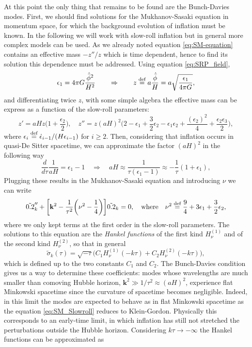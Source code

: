 At this point the only thing that remains to be found are the Bunch-Davies modes. First, we should find solutions for the Mukhanov-Sasaki equation in momentum space, for which the background evolution of inflation must be known. In the following we will work with slow-roll inflation but in general more complex models can be used. As we already noted equation \eqref{eq:SM-equation} contains an effective mass $-z''/z$ which is time dependent, hence to find its solution this dependence must be addressed. Using equation \eqref{eq:SRP_field},
$$\epsilon_1=4\pi G\frac{\dot{\bar\phi}^2}{H^2}\qquad \Rightarrow\qquad z\stackrel{\text{def}}{=} a\frac{\dot{\bar\phi}}{H}=a\sqrt{\frac{\epsilon_1}{4\pi G}},$$
 and differentiating twice $z$, with some simple algebra the effective mass can be express as a function of the slow-roll parameters: 
$$z'=aHz\Big(1+\frac{\epsilon_2}{2}\Big),\quad z''=z(aH)^2\bigg(2-\epsilon_1+\frac{3}{2}\epsilon_2- \epsilon_1\epsilon_2+\frac{(\epsilon_2)^2}{4}+\frac{\epsilon_2\epsilon_3}{2}\bigg),$$
where $\epsilon_i\stackrel{\text{def}}{=} \dot{\epsilon}_{i-1}/(H\epsilon_{i-1})$ for $i\geq 2$.
Then, considering that inflation occurs in quasi-De Sitter spacetime, we can approximate the factor $(aH)^2$ in the following way
$$\frac{d}{d\tau}\frac{1}{aH}=\epsilon_1-1\quad \Rightarrow\quad aH\approx\frac{1}{\tau(\epsilon_1-1)}\approx-\frac{1}{\tau}(1+\epsilon_1),$$
Plugging these results in the Mukhanov-Sasaki equation and introducing $\nu$ we can write
\begin{equation}
    \tilde{0.2}_k''+\bigg[\mathbf k^2-\frac{1}{\tau^2}\bigg(\nu^2-\frac{1}{4}\bigg)\bigg]\tilde{0.2}_k=0,\quad\text{where}\quad\nu^2\stackrel{\text{def}}{=} \frac{9}{4}+3\epsilon_1+\frac{3}{2}\epsilon_2,\label{eq:SM_Slowroll}
\end{equation}
where we only kept terms at the first order in the slow-roll parameters. The solutions to this equation are the \emph{Hankel functions} of the first kind $H_\nu^{(1)}$ and of the second kind $H_\nu^{(2)}$, so that in general
$$\tilde\sigma_k(\tau)=\sqrt{-\tau}\big(C_1H_\nu^{(1)}(-k\tau)+C_2H_\nu^{(2)}(-k\tau)\big),$$ which is defined up to the two constants $C_1$ and $C_2$. The Bunch-Davies condition gives us a way to determine these coefficients: modes whose wavelengths are much smaller than comoving Hubble horizon, $\mathbf k^2\gg1/\tau^2\approx(aH)^2$, experience flat Minkowski spacetime since the curvature of spacetime becomes negligible. Indeed, in this limit the modes are expected to behave as in flat Minkowski spacetime as the equation \eqref{eq:SM_Slowroll} reduces to Klein-Gordon. Physically this corresponds to an early-time limit, in which inflation has still not stretched the perturbations outside the Hubble horizon. Considering $k\tau\to-\infty$ the Hankel functions can be approximated as
